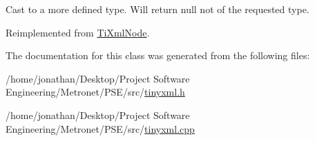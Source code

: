 Cast to a more defined type. Will return null not of the requested type. 



Reimplemented from \hyperlink{class_ti_xml_node_a6a4c8ac28ee7a745d059db6691e03bae}{Ti\+Xml\+Node}.



The documentation for this class was generated from the following files\+:\begin{DoxyCompactItemize}
\item 
/home/jonathan/\+Desktop/\+Project Software Engineering/\+Metronet/\+P\+S\+E/src/\hyperlink{tinyxml_8h}{tinyxml.\+h}\item 
/home/jonathan/\+Desktop/\+Project Software Engineering/\+Metronet/\+P\+S\+E/src/\hyperlink{tinyxml_8cpp}{tinyxml.\+cpp}\end{DoxyCompactItemize}
